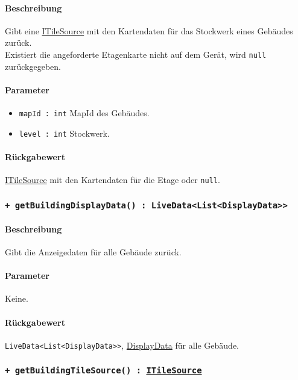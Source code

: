 \paragraph*{Beschreibung}
Gibt eine \href{https://osmdroid.github.io/osmdroid/javadocAll/org/osmdroid/tileprovider/tilesource/ITileSource.html}
{ITileSource} mit den Kartendaten für das Stockwerk eines Gebäudes zurück.\\
Existiert die angeforderte Etagenkarte nicht auf dem Gerät, wird \texttt{null} zurückgegeben.
\paragraph*{Parameter}
\begin{itemize}
    \item \texttt{mapId : int} MapId des Gebäudes.
    \item \texttt{level : int} Stockwerk.
\end{itemize}
\paragraph*{Rückgabewert}
\href{https://osmdroid.github.io/osmdroid/javadocAll/org/osmdroid/tileprovider/tilesource/ITileSource.html}
{ITileSource} mit den Kartendaten für die Etage oder \texttt{null}.

\subsubsection*{\texttt{+ getBuildingDisplayData() : LiveData<List<DisplayData>>}}\label{App_Map_Model_getBuildingDisplayData_IMap}%
\paragraph*{Beschreibung}
Gibt die Anzeigedaten für alle Gebäude zurück.
\paragraph*{Parameter}
Keine.
\paragraph*{Rückgabewert}
\texttt{LiveData<List<DisplayData>>}, \hyperref[App_Map_Util_DisplayData]{DisplayData} für alle Gebäude.

\subsubsection*{\texttt{+ getBuildingTileSource() : \href{https://osmdroid.github.io/osmdroid/javadocAll/org/osmdroid/tileprovider/tilesource/ITileSource.html}
{ITileSource}}}\label{App_Map_Model_getBuildingTileSource_IMap}%
